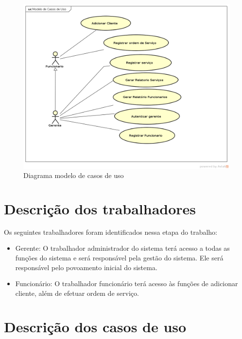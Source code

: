 \documentclass[
	12pt,				%
	openright,
	oneside,			%
	a4paper,			%
	chapter=TITLE,		%
	brazil				%
	]{abntex2}
\begin{document}
\begin{figure}[htb]
	\caption{Diagrama modelo de casos de uso}
	\begin{flushleft}
	    \includegraphics[scale=0.5]{Arquivos/caso_de_uso}  %
	\end{flushleft}
	\label{fig:caso_de_uso}
\end{figure}

\section{Descrição dos trabalhadores}

Os seguintes trabalhadores foram identificados nessa etapa do trabalho: 

\begin{itemize}
	\item Gerente: O trabalhador administrador do sistema terá acesso a todas as funções do sistema e será responsável pela gestão do sistema. Ele será responsável pelo povoamento inicial do sistema. 
	
	\item Funcionário: O trabalhador funcionário terá acesso às funções de adicionar cliente, além de efetuar ordem de serviço.
	
\end{itemize}

\newpage
\section{Descrição dos casos de uso}
\end{document}

